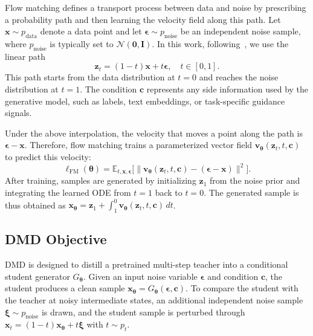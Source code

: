\documentclass{article}
\begin{document}
Flow matching defines a transport process between data and noise by prescribing a probability path and then learning the velocity field along this path. Let $\bm{x}\sim p_{\text{data}}$ denote a data point and let $\bm{\epsilon}\sim p_{\text{noise}}$ be an independent noise sample, where $p_{\text{noise}}$ is typically set to $\mathcal{N}(\mathbf{0},\mathbf{I})$. In this work, following~\citep{liu2023flow, geng2025mean}, we use the linear path
\begin{equation}
\bm{z}_t = (1-t)\bm{x} + t\bm{\epsilon}, \quad t\in[0,1].
\end{equation}
This path starts from the data distribution at $t=0$ and reaches the noise distribution at $t=1$. The condition $\bm c$ represents any side information used by the generative model, such as labels, text embeddings, or task-specific guidance signals.

Under the above interpolation, the velocity that moves a point along the path is
$\bm{\epsilon}-\bm{x}$. Therefore, flow matching trains a parameterized vector field
$\bm{v}_{\bm\theta}(\bm{z}_t,t,\bm c)$ to predict this velocity:
\begin{equation}
\ell_{\text{FM}}(\bm\theta) =
\mathbb{E}_{t,\bm{x},\bm{\epsilon}}
\Big[
\big\|
\bm{v}_{\bm\theta}(\bm{z}_t,t,\bm{c})-(\bm{\epsilon}-\bm{x})
\big\|^2
\Big].
\label{eq:fm_loss}
\end{equation}
After training, samples are generated by initializing $\bm{z}_1$ from the noise prior and integrating the learned ODE from $t=1$ back to $t=0$. The generated sample is thus obtained as
$\bm{x}_{\bm\theta}=\bm{z}_1+\int_{1}^{0}\bm{v}_{\bm\theta}(\bm{z}_t,t,\bm c)\,dt$.

\subsection{DMD Objective}

DMD is designed to distill a pretrained multi-step teacher into a conditional student generator $G_{\bm\theta}$. Given an input noise variable $\bm{\epsilon}$ and condition $\bm c$, the student produces a clean sample
$\bm{x}_{\bm\theta}=G_{\bm\theta}(\bm{\epsilon},\bm c)$. To compare the student with the teacher at noisy intermediate states, an additional independent noise sample $\bm{\xi}\sim p_{\text{noise}}$ is drawn, and the student sample is perturbed through
$\bm{x}_t=(1-t)\bm{x}_{\bm\theta}+t\bm{\xi}$ with $t\sim p_t$.
\end{document}
